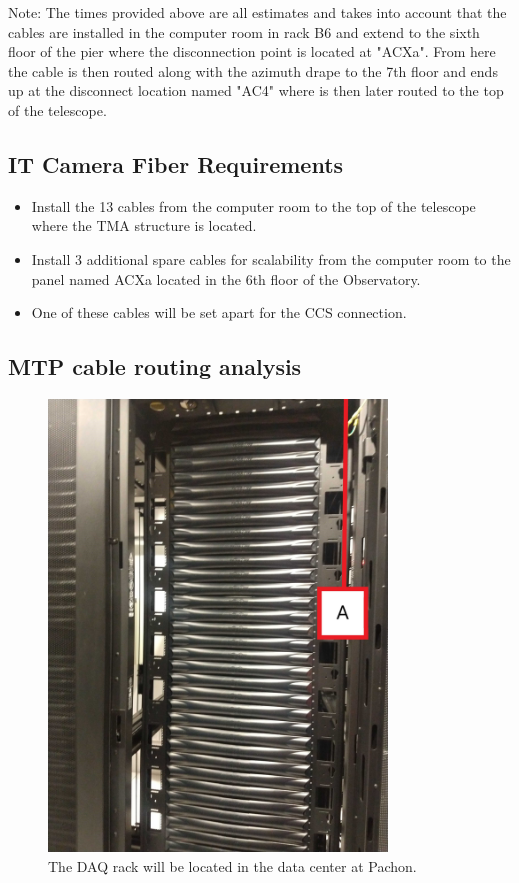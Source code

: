 Note: The times provided above are all estimates and takes into account that the cables are installed in the computer room in rack B6 and extend to the sixth floor of the pier where the disconnection point is located at "ACXa". From here the cable is then routed along with the azimuth drape to the 7th floor and ends up at the disconnect location named "AC4" where is then later routed to the top of the telescope.

\newpage
  
  \subsection{IT Camera Fiber Requirements}

  \begin{itemize}
    \item Install the 13 cables from the computer room to the top of the telescope where the TMA structure is located. 
    \item Install 3 additional spare cables for scalability from the computer room to the panel named ACXa located in the 6th floor of the Observatory.
    \item One of these cables will be set apart for the CCS connection. 
  \end{itemize}

  \subsection{MTP cable routing analysis}
  \begin{figure}
    \centering
    \includegraphics[width=9cm]{images/111.jpg}
    \caption*{The DAQ rack will be located in the data center at Pachon.} 
  \end{figure}

